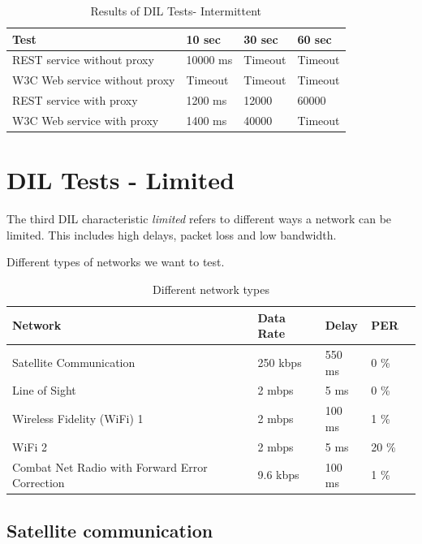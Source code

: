 \begin{table}[h]
\begin{tabular}{| l | l | l | l |}
\hline
  \textbf{Test} & \textbf{10 sec} & \textbf{30 sec} & \textbf{60 sec} \\ \hline
  REST service without proxy & 10000 ms & Timeout & Timeout \\ \hline
  W3C Web service without proxy & Timeout & Timeout & Timeout \\ \hline
  REST service with proxy & 1200 ms & 12000 & 60000 \\ \hline
  W3C Web service with proxy & 1400 ms & 40000 & Timeout \\ \hline
\end{tabular}
\caption{Results of DIL Tests- Intermittent}
\end{table}

\section{DIL Tests - Limited}

The third DIL characteristic \textit{limited} refers to different ways a network
can be limited. This includes high delays, packet loss and low bandwidth.

Different types of networks we want to test.

\begin{table}[h]
\begin{tabular}{| l | l | l | l | l |}
\hline
  \textbf{Network} & \textbf{Data Rate} & \textbf{Delay} & \textbf{PER} \\ \hline
  Satellite Communication & 250 kbps & 550 ms & 0 \% \\ \hline
  Line of Sight & 2 mbps & 5 ms & 0 \% \\ \hline
  Wireless Fidelity (WiFi) 1 & 2 mbps & 100 ms & 1 \% \\ \hline
  WiFi 2 & 2 mbps & 5 ms & 20 \% \\ \hline
  Combat Net Radio with Forward Error Correction & 9.6 kbps & 100 ms & 1 \% \\ \hline

\end{tabular}
\caption{Different network types}
\end{table}


\subsection{Satellite communication}

